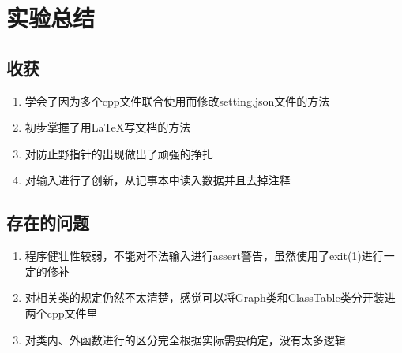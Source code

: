 \documentclass[a4,10pt]{article}
\begin{document}
\section{实验总结}
  \subsection{收获}
  \begin{enumerate}
      \item {学会了因为多个cpp文件联合使用而修改setting.json文件的方法}
      \item {初步掌握了用\LaTeX{}写文档的方法}
      \item {对防止野指针的出现做出了顽强的挣扎}
      \item {对输入进行了创新，从记事本中读入数据并且去掉注释}
  \end{enumerate}
  \subsection{存在的问题}
    \begin{enumerate}
      \item {程序健壮性较弱，不能对不法输入进行assert警告，虽然使用了exit(1)进行一定的修补}
      \item {对相关类的规定仍然不太清楚，感觉可以将Graph类和ClassTable类分开装进两个cpp文件里}
      \item {对类内、外函数进行的区分完全根据实际需要确定，没有太多逻辑}
  \end{enumerate}

\end{document}

